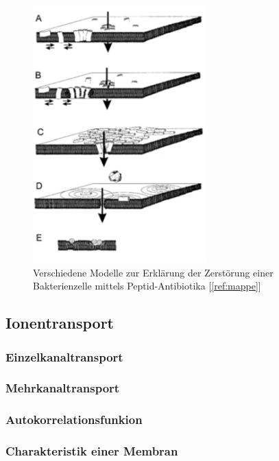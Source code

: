 \documentclass[a4paper,ngerman]{scrartcl}
\begin{document}
\begin{figure}
\includegraphics[width=0.6\textwidth]{wirkmechanismus.png}
\caption{Verschiedene Modelle zur Erklärung der Zerstörung einer Bakterienzelle mittels Peptid-Antibiotika [\ref{ref:mappe}]}
\label{fig:wirkmechanismus}
\end{figure}

\subsection{Ionentransport}
	

\subsubsection{Einzelkanaltransport}



\subsubsection{Mehrkanaltransport}


\subsubsection{Autokorrelationsfunkion}


\subsubsection{Charakteristik einer Membran}
\end{document}
